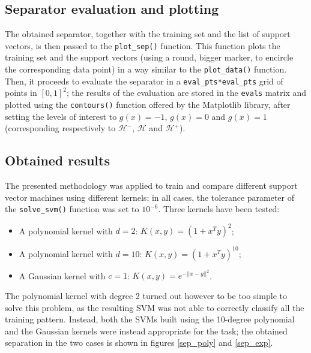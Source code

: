 \documentclass[letterpaper,headings=standardclasses]{scrartcl}
\begin{document}
\subsection{Separator evaluation and plotting}

The obtained separator, together with the training set and the list of support vectors, is then passed to the \texttt{plot\_sep()} function. This function plots the training set and the support vectors (using a round, bigger marker, to encircle the corresponding data point) in a way similar to the \texttt{plot\_data()} function. Then, it proceeds to evaluate the separator in a \texttt{eval\_pts*eval\_pts} grid of points in $[0,1]^2$; the results of the evaluation are stored in the \texttt{evals} matrix and plotted using the \texttt{contours()} function offered by the Matplotlib library, after setting the levels of interest to $g(x) = -1$, $g(x) = 0$ and $g(x) = 1$ (corresponding respectively to $\mathcal{H}^-$, $\mathcal{H}$ and $\mathcal{H}^+$).

\subsection{Obtained results}

The presented methodology was applied to train and compare different support vector machines using different kernels; in all cases, the tolerance parameter of the \texttt{solve\_svm()} function was set to $10^{-6}$. Three kernels have been tested:

\begin{itemize}
    \item A polynomial kernel with $d = 2$: $K(x, y) = (1 + x^T y)^2$;
    \item A polynomial kernel with $d = 10$: $K(x, y) = (1 + x^T y)^{10}$;
    \item A Gaussian kernel with $c = 1$: $K(x, y) = e^{-||x - y||^2}$.
\end{itemize}

The polynomial kernel with degree 2 turned out however to be too simple to solve this problem, as the resulting SVM was not able to correctly classify all the training pattern. Instead, both the SVMs built using the 10-degree polynomial and the Gaussian kernels were instead appropriate for the task; the obtained separation in the two cases is shown in figures \ref{sep_poly} and \ref{sep_exp}.
\end{document}
